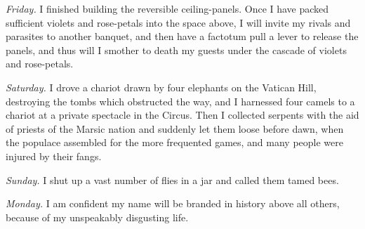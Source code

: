 \emph{Friday.} I finished building the reversible ceiling-panels. Once I have packed sufficient violets and rose-petals into the space above, I will invite my rivals and parasites to another banquet, and then have a factotum pull a lever to release the panels, and thus will I smother to death my guests under the cascade of violets and rose-petals.

\emph{Saturday.} I drove a chariot drawn by four elephants on the Vatican Hill, destroying the tombs which obstructed the way, and I harnessed four camels to a chariot at a private spectacle in the Circus. Then I collected serpents with the aid of priests of the Marsic nation and suddenly let them loose before dawn, when the populace assembled for the more frequented games, and many people were injured by their fangs.

\emph{Sunday.} I shut up a vast number of flies in a jar and called them tamed bees.

\emph{Monday.} I am confident my name will be branded in history above all others, because of my unspeakably disgusting life.